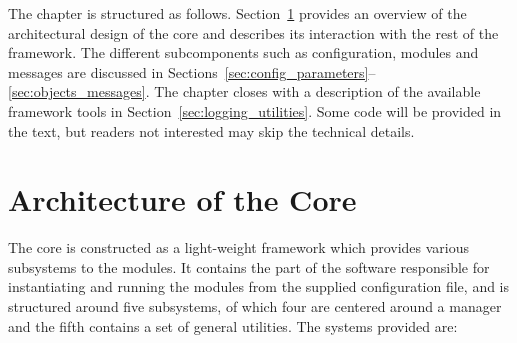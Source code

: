 The chapter is structured as follows.
Section~\ref{sec:arch} provides an overview of the architectural design of the core and describes its interaction with the rest of the \apsq framework.
The different subcomponents such as configuration, modules and messages are discussed in Sections~\ref{sec:config_parameters}--\ref{sec:objects_messages}.
The chapter closes with a description of the available framework tools in Section~\ref{sec:logging_utilities}.
Some \CPP code will be provided in the text, but readers not interested may skip the technical details.

\section{Architecture of the Core}
\label{sec:arch}
The core is constructed as a light-weight framework which provides various subsystems to the modules.
It contains the part of the software responsible for instantiating and running the modules from the supplied configuration file, and is structured around five subsystems, of which four are centered around a manager and the fifth contains a set of general utilities.
The systems provided are:
